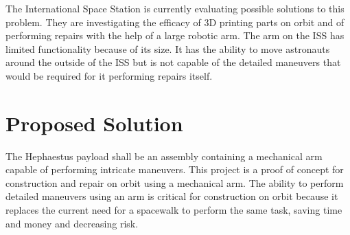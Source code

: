 \documentclass[letterpaper,10pt]{article}
\begin{document}
The International Space Station is currently evaluating possible solutions to this problem. They are 
investigating the efficacy of 3D printing parts on orbit and of performing repairs with the help of 
a large robotic arm. The arm on the ISS has limited functionality because of its size.
 It has the ability to move astronauts around the outside of the ISS but is not capable of the detailed maneuvers that would be required for it performing repairs itself.


\section{Proposed Solution}
The Hephaestus payload shall be an assembly containing a mechanical arm capable of performing intricate maneuvers.
This project is a proof of concept for construction and repair on orbit using a mechanical arm. 
The ability to perform detailed maneuvers using an arm is critical for construction on orbit because
it replaces the current need for a spacewalk to perform the same task, saving time and money and decreasing risk.
\end{document}
